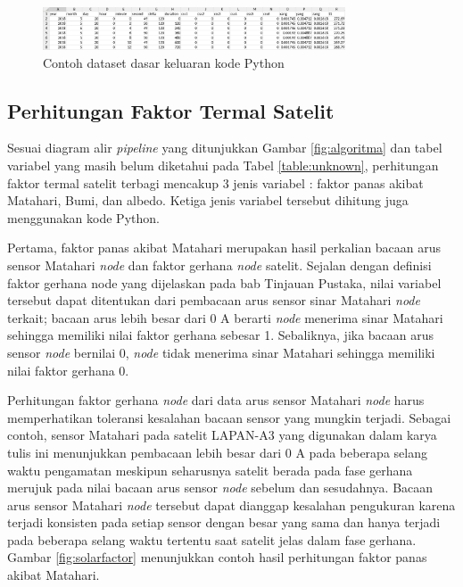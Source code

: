 \begin{figure}[H]
\setlength{}
\begin{center}
\includegraphics[width=0.8\textwidth]{fig/basedataset.png}
\caption{Contoh dataset dasar keluaran kode Python}
\label{fig:basedataset}
\end{center}
\end{figure}

\subsection{Perhitungan Faktor Termal Satelit}

Sesuai diagram alir \textit{pipeline} yang ditunjukkan Gambar
\ref{fig:algoritma} dan tabel variabel yang masih belum diketahui pada Tabel
\ref{table:unknown}, perhitungan faktor termal satelit terbagi mencakup 3 jenis
variabel : faktor panas akibat Matahari, Bumi, dan albedo. Ketiga jenis
variabel tersebut dihitung juga menggunakan kode Python. 

Pertama, faktor panas akibat Matahari merupakan hasil perkalian bacaan arus
sensor Matahari \textit{node} dan faktor gerhana \textit{node} satelit. Sejalan
dengan definisi faktor gerhana node yang dijelaskan pada bab Tinjauan Pustaka,
nilai variabel tersebut dapat ditentukan dari pembacaan arus sensor sinar
Matahari \textit{node} terkait; bacaan arus lebih besar dari 0 A berarti
\textit{node} menerima sinar Matahari sehingga memiliki nilai faktor gerhana
sebesar 1. Sebaliknya, jika bacaan arus sensor \textit{node} bernilai 0,
\textit{node} tidak menerima sinar Matahari sehingga memiliki nilai faktor
gerhana 0.

Perhitungan faktor gerhana \textit{node} dari data arus sensor Matahari
\textit{node} harus memperhatikan toleransi kesalahan bacaan sensor yang
mungkin terjadi. Sebagai contoh, sensor Matahari pada satelit LAPAN-A3 yang
digunakan dalam karya tulis ini menunjukkan pembacaan lebih besar dari 0 A pada
beberapa selang waktu pengamatan meskipun seharusnya satelit berada pada fase
gerhana merujuk pada nilai bacaan arus sensor \textit{node} sebelum dan
sesudahnya. Bacaan arus sensor Matahari \textit{node} tersebut dapat dianggap
kesalahan pengukuran karena terjadi konsisten pada setiap sensor dengan besar
yang sama dan hanya terjadi pada beberapa selang waktu tertentu saat satelit
jelas dalam fase gerhana. Gambar \ref{fig:solarfactor} menunjukkan contoh hasil perhitungan faktor panas akibat Matahari. 


